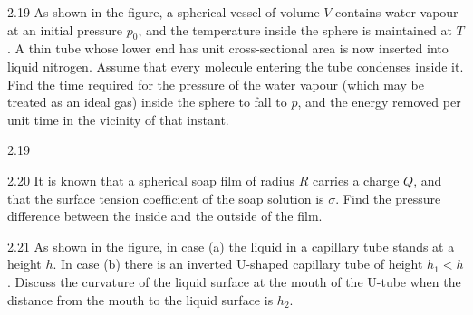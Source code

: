 \begin{problem}{2.19}
As shown in the figure, a spherical vessel of volume $V$ contains water vapour at an initial pressure $p_0$, and the temperature inside the sphere is maintained at $T$. A thin tube whose lower end has unit cross-sectional area is now inserted into liquid nitrogen. Assume that every molecule entering the tube condenses inside it. Find the time required for the pressure of the water vapour (which may be treated as an ideal gas) inside the sphere to fall to $p$, and the energy removed per unit time in the vicinity of that instant.
\end{problem}

\begin{figbox}{2.19}
\end{figbox}

\begin{problem}{2.20}
It is known that a spherical soap film of radius $R$ carries a charge $Q$, and that the surface tension coefficient of the soap solution is $\sigma$. Find the pressure difference between the inside and the outside of the film.
\end{problem}

\begin{problem}{2.21}
As shown in the figure, in case (a) the liquid in a capillary tube stands at a height $h$. In case (b) there is an inverted U-shaped capillary tube of height $h_1 < h$. Discuss the curvature of the liquid surface at the mouth of the U-tube when the distance from the mouth to the liquid surface is $h_2$.
\end{problem}

